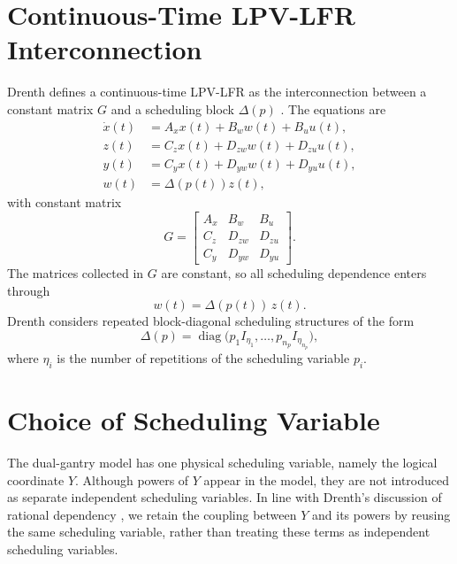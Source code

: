 \documentclass[11pt]{article}
\newcommand{\diag}{\operatorname{diag}}
\begin{document}
\section{Continuous-Time LPV-LFR Interconnection}
Drenth defines a continuous-time LPV-LFR as the interconnection between a
constant matrix $G$ and a scheduling block $\Delta(p)$
\cite{drenth2025thesis}. The equations are
\begin{align}
    \dot{x}(t) &= A_x x(t) + B_w w(t) + B_u u(t),
    \label{eqs:lfrstate} \\
    z(t) &= C_z x(t) + D_{zw} w(t) + D_{zu} u(t),
    \label{eqs:lfrz} \\
    y(t) &= C_y x(t) + D_{yw} w(t) + D_{yu} u(t),
    \label{eqs:lfry} \\
    w(t) &= \Delta(p(t)) z(t),
    \label{eqs:lfrw}
\end{align}
with constant matrix
\begin{equation}
    G =
    \begin{bmatrix}
        A_x & B_w & B_u \\
        C_z & D_{zw} & D_{zu} \\
        C_y & D_{yw} & D_{yu}
    \end{bmatrix}.
    \label{eqs:G}
\end{equation}
The matrices collected in $G$ are constant, so all scheduling dependence enters
through
\[
w(t)=\Delta(p(t))\,z(t).
\]
Drenth considers repeated block-diagonal scheduling structures of the form
\begin{equation}
    \Delta(p) =
    \diag\!\bigl(p_1 I_{\eta_1}, \dots, p_{n_p} I_{\eta_{n_p}}\bigr),
    \label{eqs:deltageneric}
\end{equation}
where $\eta_i$ is the number of repetitions of the scheduling variable $p_i$.


\section{Choice of Scheduling Variable}
The dual-gantry model has one physical scheduling variable, namely the logical
coordinate $Y$. Although powers of $Y$ appear in the model, they are not
introduced as separate independent scheduling variables. In line with Drenth's discussion of rational dependency
\cite{drenth2025thesis}, we retain the coupling between $Y$ and its powers by
reusing the same scheduling variable, rather than treating these terms as
independent scheduling variables.
\end{document}
